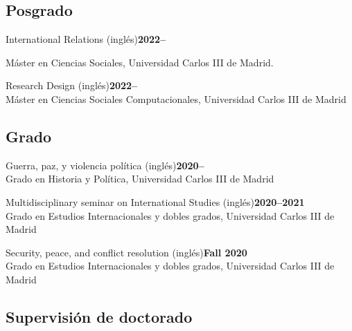 \documentclass[a4paper, 12pt]{article}
\begin{document}

\subsection*{Posgrado}

\noindent
International Relations (inglés)\hfill\textbf{2022--}\\
{\small Máster en Ciencias Sociales, Universidad Carlos III de Madrid.
\vspace{10pt}

\noindent
Research Design (inglés)\hfill\textbf{2022--}\\
{\small Máster en Ciencias Sociales Computacionales, Universidad Carlos III de Madrid}

\subsection*{Grado}

\noindent
Guerra, paz, y violencia política (inglés)\hfill\textbf{2020--}\\
{\small Grado en Historia y Política, Universidad Carlos III de Madrid}
\vspace{10pt}

\noindent
Multidisciplinary seminar on International Studies (inglés)\hfill\textbf{2020--2021}\\
{\small Grado en Estudios Internacionales y dobles grados, Universidad Carlos III de Madrid}
\vspace{10pt}

\noindent
Security, peace, and conflict resolution (inglés)\hfill\textbf{Fall 2020}\\
{\small Grado en Estudios Internacionales y dobles grados, Universidad Carlos III de Madrid}

\subsection*{Supervisión de doctorado}

}
\end{document}
